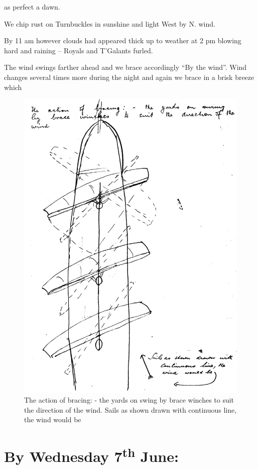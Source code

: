\documentclass[
  11pt,
  msmallroyalvopaper
]{memoir}
\begin{document}
as perfect a dawn.

We chip rust on Turnbuckles in sunshine and light West by N. wind.

By 11 am however clouds had appeared thick up to weather at 2 pm blowing
hard and raining -- Royals and T'Galants furled.

The wind swings farther ahead and we brace accordingly ``By the wind''.
Wind changes several times more during the night and again we brace in a
brisk breeze which

\begin{figure}
\centering
\includegraphics{./images/illustration2.jpg}
\caption{The action of bracing: - the yards on swing by brace winches to
suit the direction of the wind. Sails as shown drawn with continuous
line, the wind would be}
\end{figure}

\hypertarget{by-wednesday-7th-june}{%
\section{\texorpdfstring{By Wednesday 7\textsuperscript{th}
June:}{By Wednesday 7th June:}}\label{by-wednesday-7th-june}}
\end{document}
